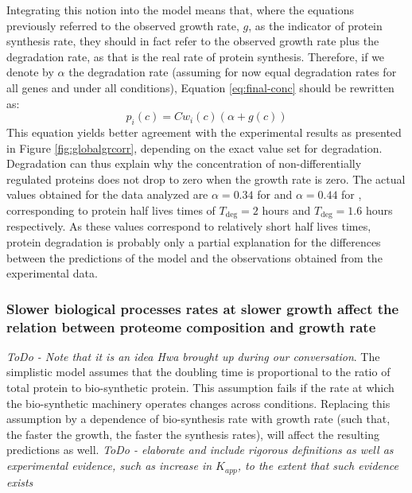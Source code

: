\documentclass[notitlepage]{article}
\begin{document}
Integrating this notion into the model means that, where the equations previously referred to the observed growth rate, $g$, as the indicator of protein synthesis rate, they should in fact refer to the observed growth rate plus the degradation rate, as that is the real rate of protein synthesis.
Therefore, if we denote by $\alpha$ the degradation rate (assuming for now equal degradation rates for all genes and under all conditions), Equation \ref{eq:final-conc} should be rewritten as:
\begin{equation}
  \label{eq:final-conc-deg}
  p_i(c)=Cw_i(c)(\alpha+g(c))
\end{equation}
This equation yields better agreement with the experimental results as presented in Figure \ref{fig:globalgrcorr}, depending on the exact value set for degradation.
Degradation can thus explain why the concentration of non-differentially regulated proteins does not drop to zero when the growth rate is zero.
The actual values obtained for the data analyzed are $\alpha=0.34$ for \cite{Valgepea2013} and $\alpha=0.44$ for \cite{Heinemann2014}, corresponding to protein half lives times of $T_{\text{deg}}=2$ hours and $T_{\text{deg}}=1.6$ hours respectively.
As these values correspond to relatively short half lives times, protein degradation is probably only a partial explanation for the differences between the predictions of the model and the observations obtained from the experimental data.

\subsubsection{Slower biological processes rates at slower growth affect the relation between proteome composition and growth rate}
\emph{ToDo - Note that it is an idea Hwa brought up during our conversation}.
The simplistic model assumes that the doubling time is proportional to the ratio of total protein to bio-synthetic protein.
This assumption fails if the rate at which the bio-synthetic machinery operates changes across conditions.
Replacing this assumption by a dependence of bio-synthesis rate with growth rate (such that, the faster the growth, the faster the synthesis rates), will affect the resulting predictions as well.
\emph{ToDo - elaborate and include rigorous definitions as well as experimental evidence, such as increase in $K_{app}$, to the extent that such evidence exists}
\end{document}
